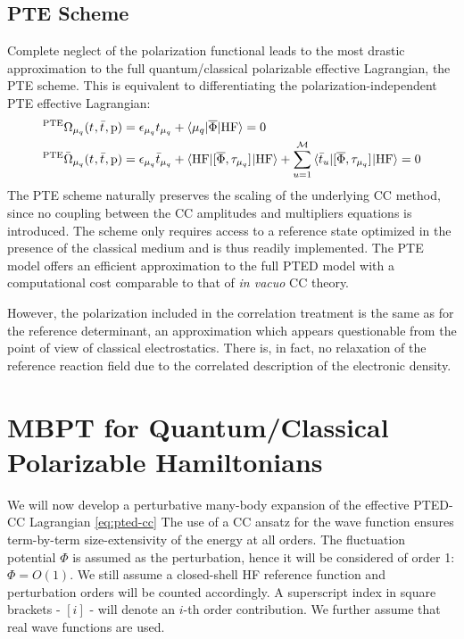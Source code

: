 \subsection*{PTE Scheme}

Complete neglect of the polarization functional leads to the most
drastic approximation to the full quantum/classical polarizable
effective Lagrangian, the \acrshort{PTE} scheme.
This is equivalent to differentiating the polarization-independent
\acrshort{PTE} effective Lagrangian:
\begin{subequations}
  \begin{align}
 {}^{\mathrm{PTE}}\Omega_{\mu_q}(t_{}, \bar{t}_{}, \mathrm{p})  &=
   \epsilon_{\mu_q}t_{\mu_q} + \braket{\mu_q | \overline{\Phi} | \mathrm{HF}}
    = 0 \\
   {}^{\mathrm{PTE}}\bar{\Omega}_{\mu_q}(t_{}, \bar{t}_{}, \mathrm{p})
    &=
    \epsilon_{\mu_q}\bar{t}_{\mu_q} +
    \braket{\mathrm{HF} | [ \overline{\Phi}, \tau_{\mu_q} ]^{} | \mathrm{HF}} +
    \sum_{u=1}^{\mathcal{M}}\braket{\bar{t}_{u} |
    [ \overline{\Phi}, \tau_{\mu_q} ]^{} | \mathrm{HF}}
    = 0
  \end{align}
\end{subequations}
The \acrshort{PTE} scheme naturally preserves the scaling of the underlying
\acrshort{CC} method, since no coupling between the \acrshort{CC} amplitudes and
multipliers equations is introduced.
The scheme only requires access to a
reference state optimized in the presence of the classical medium and is
thus readily implemented.
The \acrshort{PTE} model offers an efficient approximation to the full
\acrshort{PTED} model with a computational cost comparable to that of
\emph{in vacuo} \acrshort{CC} theory.

However, the polarization included in the correlation treatment is the
same as for the reference determinant, an approximation which appears
questionable from the point of view of classical electrostatics. There
is, in fact, no relaxation of the reference reaction field due to the
correlated description of the electronic density.

\section[MBPT for Quantum/Classical Polarizable Hamiltonians]{
MBPT for Quantum/Classical Polarizable Hamiltonians}\label{sec:mbpt-polarizable}

We will now develop a perturbative many-body expansion of the effective
\acrshort{PTED}-\acrshort{CC} Lagrangian \eqref{eq:pted-cc}
The use of a \acrshort{CC} ansatz for the wave function ensures term-by-term
size-extensivity of the energy at all orders.\autocite{Helgaker2000-tz}
The fluctuation potential $\Phi$ is assumed as the perturbation, hence
it will be considered of order 1: $\Phi = O(1)$.
We still assume a closed-shell \acrshort{HF} reference function and
perturbation orders will be counted accordingly.
A superscript index in square brackets - $[i]$ -  will denote an $i$-th
order contribution.
We further assume that real wave functions are used.

